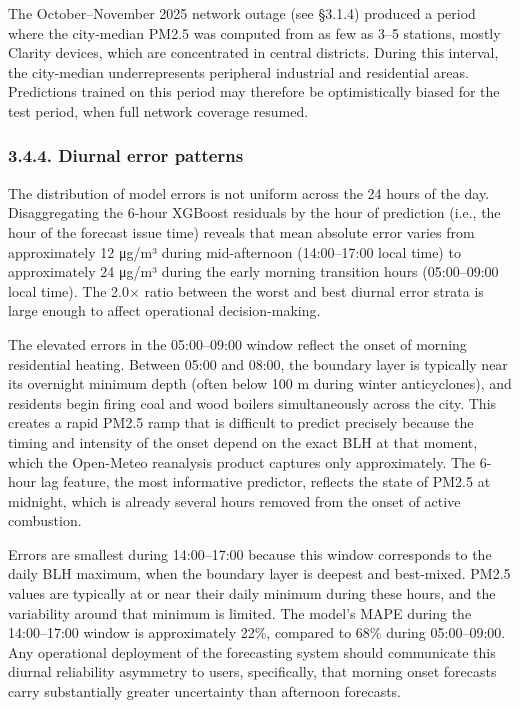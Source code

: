 The October--November 2025 network outage (see §3.1.4) produced a period where the city-median PM2.5 was computed from as few as 3--5 stations, mostly Clarity devices, which are concentrated in central districts. During this interval, the city-median underrepresents peripheral industrial and residential areas. Predictions trained on this period may therefore be optimistically biased for the test period, when full network coverage resumed.

\subsubsection{3.4.4. Diurnal error patterns}\label{diurnal-error-patterns}

The distribution of model errors is not uniform across the 24 hours of the day. Disaggregating the 6-hour XGBoost residuals by the hour of prediction (i.e., the hour of the forecast issue time) reveals that mean absolute error varies from approximately 12 μg/m³ during mid-afternoon (14:00--17:00 local time) to approximately 24 μg/m³ during the early morning transition hours (05:00--09:00 local time). The 2.0× ratio between the worst and best diurnal error strata is large enough to affect operational decision-making.

The elevated errors in the 05:00--09:00 window reflect the onset of morning residential heating. Between 05:00 and 08:00, the boundary layer is typically near its overnight minimum depth (often below 100 m during winter anticyclones), and residents begin firing coal and wood boilers simultaneously across the city. This creates a rapid PM2.5 ramp that is difficult to predict precisely because the timing and intensity of the onset depend on the exact BLH at that moment, which the Open-Meteo reanalysis product captures only approximately. The 6-hour lag feature, the most informative predictor, reflects the state of PM2.5 at midnight, which is already several hours removed from the onset of active combustion.

Errors are smallest during 14:00--17:00 because this window corresponds to the daily BLH maximum, when the boundary layer is deepest and best-mixed. PM2.5 values are typically at or near their daily minimum during these hours, and the variability around that minimum is limited. The model's MAPE during the 14:00--17:00 window is approximately 22\%, compared to 68\% during 05:00--09:00. Any operational deployment of the forecasting system should communicate this diurnal reliability asymmetry to users, specifically, that morning onset forecasts carry substantially greater uncertainty than afternoon forecasts.

